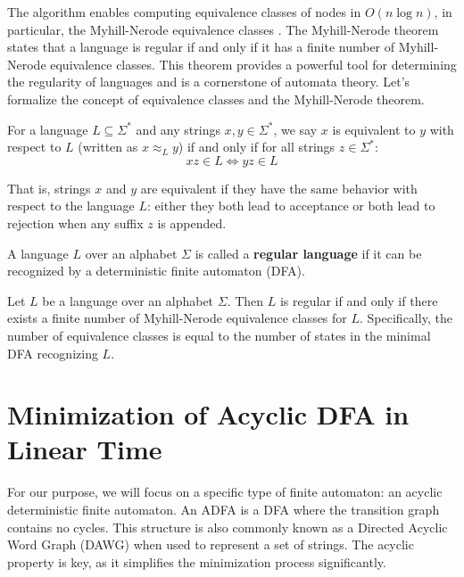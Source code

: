 The algorithm enables computing equivalence classes of nodes in $O(n\log n)$, in particular, the Myhill-Nerode equivalence classes \cite{nerode1958linear, myhill1957finite}. The Myhill-Nerode theorem states that a language is regular if and only if it has a finite number of Myhill-Nerode equivalence classes. This theorem provides a powerful tool for determining the regularity of languages and is a cornerstone of automata theory. Let's formalize the concept of equivalence classes and the Myhill-Nerode theorem.

\begin{definition}
    For a language $L \subseteq \Sigma^*$ and any strings $x,y \in \Sigma^*$, we say $x$ is equivalent to $y$ with respect to $L$ (written as $x \approx_L y$) if and only if for all strings $z \in \Sigma^*$:
    \[ xz \in L \Leftrightarrow yz \in L \]
\end{definition}
That is, strings $x$ and $y$ are equivalent if they have the same behavior with respect to the language $L$: either they both lead to acceptance or both lead to rejection when any suffix $z$ is appended.

\begin{definition}
    A language $L$ over an alphabet $\Sigma$ is called a \textbf{regular language} if it can be recognized by a deterministic finite automaton (DFA).
\end{definition}

\begin{theorem} \label{def:myhill-nerode}
    Let $L$ be a language over an alphabet $\Sigma$. Then $L$ is regular if and only if there exists a finite number of Myhill-Nerode equivalence classes for $L$. Specifically, the number of equivalence classes is equal to the number of states in the minimal DFA recognizing $L$.
\end{theorem}

\section{Minimization of Acyclic DFA in Linear Time} \label{sec:revuz}
For our purpose, we will focus on a specific type of finite automaton: an acyclic deterministic finite automaton. An ADFA is a DFA where the transition graph contains no cycles. This structure is also commonly known as a Directed Acyclic Word Graph (DAWG) when used to represent a set of strings. The acyclic property is key, as it simplifies the minimization process significantly. 

